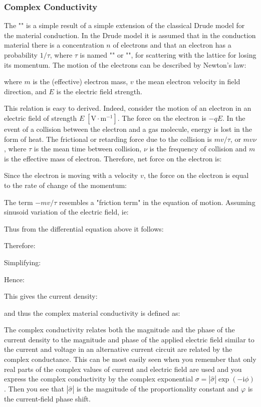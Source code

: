 	\pagebreak
	\subsubsection{Complex Conductivity}\label{complex conductivity}
	The "" is a simple result of a simple extension of the classical Drude model for the material conduction. In the Drude model it is assumed that in the conduction material there is a concentration $n$ of electrons and that an electron has a probability $1/\tau$, where $\tau$ is named "" or "", for scattering with the lattice for losing its momentum. The motion of the electrons can be described by Newton's law:
	
	where $m$ is the (effective) electron mass, $v$ the mean electron velocity in field direction, and $E$ is the electric field strength.
	
	This relation is easy to derived. Indeed, consider the motion of an electron in an electric field of strength $E\;[\text{V}\cdot \text{m}^{-1}]$. The force on the electron is $-qE$. In the event of a collision between the electron and a gas molecule, energy is lost in the form of heat. The frictional or retarding force due to the collision is $mv/\tau$, or $mv\nu$, where $\tau$ is the mean time between collision, $\nu$ is the frequency of collision and $m$ is the effective mass of electron. Therefore, net force on the electron is:
	
	Since the electron is moving with a velocity $v$, the force on the electron is equal to the rate of change of the momentum:
	
	
	
	The term $-mv/\tau$ resembles a "friction term" in the equation of motion. Assuming sinusoid variation of the electric field, ie:
	
	Thus from the differential equation above it follows:
	
	Therefore:	
	
	Simplifying:
	
	Hence:
	
	This gives the current density:
	
	and thus the complex material conductivity is defined as:
	
	
	The complex conductivity relates both the magnitude and the phase of the current density to the magnitude and phase of the applied electric field similar to the current and voltage in an alternative current circuit are related by the complex conductance. This can be most easily seen when you remember that only real parts of the complex values of current and electric field are used and you express the complex conductivity by the complex exponential $\sigma=|\hat{\sigma}|\exp( -\mathrm{i}\phi)$. Then you see that $|\hat{\sigma}|$ is the magnitude of the proportionality constant and $\varphi$ is the current-field phase shift.
	
